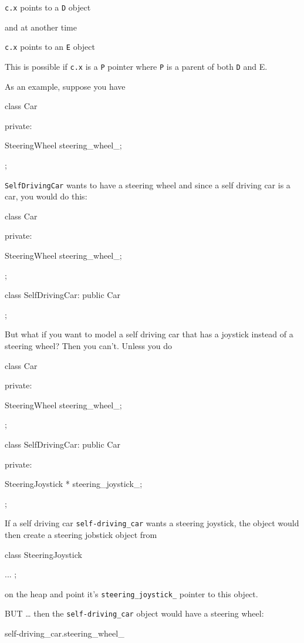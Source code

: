 \texttt{c.x} points to a \texttt{D} object

and at another time

\texttt{c.x} points to an \texttt{E} object

This is possible if \texttt{c.x} is a \texttt{P} pointer where \texttt{P} is a
parent of both \texttt{D} and E.

As an example, suppose you have

class Car

{

private:

SteeringWheel steering_wheel_;

};

\texttt{SelfDrivingCar} wants to have a steering wheel and since a self
driving car is a car, you would do this:

class Car

{

private:

SteeringWheel steering_wheel_;

};

class SelfDrivingCar: public Car

{

};

But what if you want to model a self driving car that has a joystick
instead of a steering wheel? Then you can't. Unless you do

class Car

{

private:

SteeringWheel steering_wheel_;

};

class SelfDrivingCar: public Car

{

private:

SteeringJoystick * steering_joystick_;

};

If a self driving car \texttt{self-driving_car} wants a steering
joystick, the object would then create a steering jobstick object from

class SteeringJoystick

{ ... };

on the heap and point it's \texttt{steering_joystick_} pointer to this
object.

BUT \ldots{} then the \texttt{self-driving_car} object would have a
steering wheel:

self-driving_car.steering_wheel_

